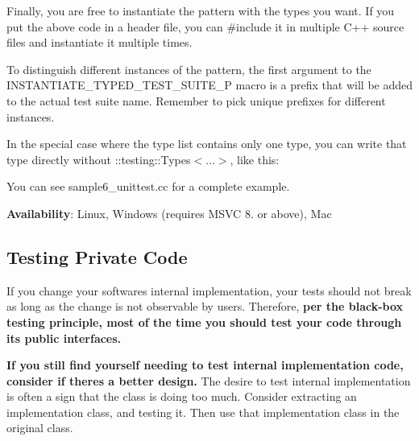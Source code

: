 \begin{DoxyCode}{0}
\end{DoxyCode}


Finally, you are free to instantiate the pattern with the types you want. If you put the above code in a header file, you can {\ttfamily \#include} it in multiple C++ source files and instantiate it multiple times.


\begin{DoxyCode}{0}
\end{DoxyCode}


To distinguish different instances of the pattern, the first argument to the {\ttfamily I\+N\+S\+T\+A\+N\+T\+I\+A\+T\+E\+\_\+\+T\+Y\+P\+E\+D\+\_\+\+T\+E\+S\+T\+\_\+\+S\+U\+I\+T\+E\+\_\+P} macro is a prefix that will be added to the actual test suite name. Remember to pick unique prefixes for different instances.

In the special case where the type list contains only one type, you can write that type directly without {\ttfamily \+::testing\+::\+Types$<$...$>$}, like this\+:


\begin{DoxyCode}{0}
\end{DoxyCode}


You can see {\ttfamily sample6\+\_\+unittest.\+cc} for a complete example.

{\bfseries{Availability}}\+: Linux, Windows (requires M\+S\+VC 8. or above), Mac

\subsection*{Testing Private Code}

If you change your software\textquotesingle{}s internal implementation, your tests should not break as long as the change is not observable by users. Therefore, {\bfseries{per the black-\/box testing principle, most of the time you should test your code through its public interfaces.}}

{\bfseries{If you still find yourself needing to test internal implementation code, consider if there\textquotesingle{}s a better design.}} The desire to test internal implementation is often a sign that the class is doing too much. Consider extracting an implementation class, and testing it. Then use that implementation class in the original class.

